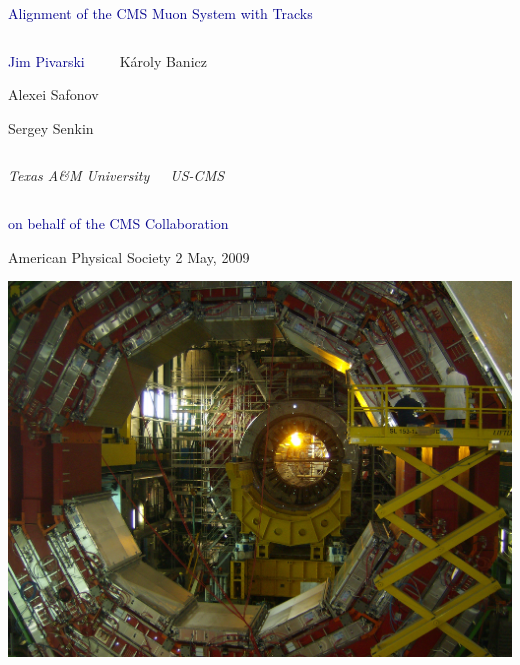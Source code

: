 \documentclass[compress]{beamer}
\begin{document}
\begin{frame}
\vfill
\begin{center}
\textcolor{darkblue}{\Large Alignment of the CMS Muon System with Tracks}

\vfill
\begin{columns}
\begin{center}
\large
\textcolor{darkblue}{Jim Pivarski}

\vspace{0.2 cm}
Alexei Safonov

\vspace{0.2 cm}
Sergey Senkin
\end{center}

\begin{center}
\large
K\'aroly Banicz
\end{center}
\end{columns}

\begin{columns}
\begin{center}
\scriptsize
{\it Texas A\&M University}
\end{center}
\begin{center}
\scriptsize
{\it US-CMS}
\end{center}
\end{columns}

\vspace{0.5 cm}
\textcolor{darkblue}{on behalf of the CMS Collaboration}

\vspace{1 cm}
American Physical Society \hspace{1 cm} 2 May, 2009

\end{center}
\end{frame}

\small

\begin{frame}
\vspace{0.3 cm}
\includegraphics[width=\linewidth]{sun_shines_in_the_detector.jpg}
\end{frame}
\end{document}
